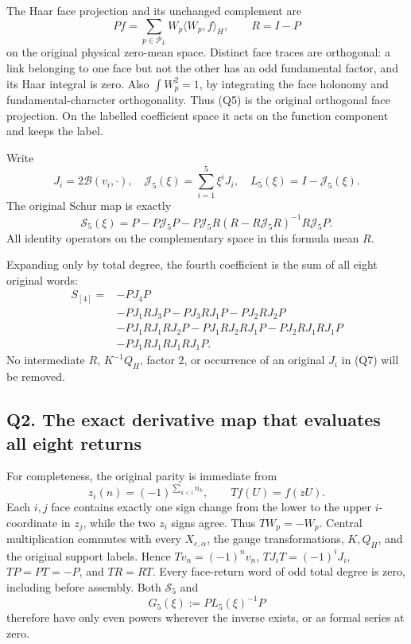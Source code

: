 \documentclass[11pt]{article}
\begin{document}
The Haar face projection and its unchanged complement are
\[
 Pf=\sum_{p\in\mathcal P_L}W_p\langle W_p,f\rangle_H,\qquad R=I-P
 \tag{Q5}
\]
on the original physical zero-mean space. Distinct face traces are orthogonal: a link belonging to one face but not the other has an odd fundamental factor, and its Haar integral is zero. Also \(\int W_p^2=1\), by integrating the face holonomy and fundamental-character orthogonality. Thus (Q5) is the original orthogonal face projection. On the labelled coefficient space it acts on the function component and keeps the label.

Write
\[
 J_i=2\mathcal B(v_i,\cdot),\quad
 \mathcal J_5(\xi)=\sum_{i=1}^5\xi^iJ_i,\quad
 L_5(\xi)=I-\mathcal J_5(\xi).
\]
The original Schur map is exactly
\[
 \mathscr S_5(\xi)
 =P-P\mathcal J_5P
 -P\mathcal J_5R(R-R\mathcal J_5R)^{-1}R\mathcal J_5P .
 \tag{Q6}
\]
All identity operators on the complementary space in this formula mean \(R\).

Expanding only by total degree, the fourth coefficient is the sum of all eight original words:
\[
 \begin{aligned}
 S_{[4]}={}&-PJ_4P\\
 &-PJ_1RJ_3P-PJ_3RJ_1P-PJ_2RJ_2P\\
 &-PJ_1RJ_1RJ_2P-PJ_1RJ_2RJ_1P-PJ_2RJ_1RJ_1P\\
 &-PJ_1RJ_1RJ_1RJ_1P.
 \end{aligned}\tag{Q7}
\]
No intermediate \(R\), \(K^{-1}Q_H\), factor 2, or occurrence of an original \(J_i\) in (Q7) will be removed.

\subsection*{Q2. The exact derivative map that evaluates all eight returns}

For completeness, the original parity is immediate from
\[
 z_i(n)=(-1)^{\sum_{k<i}n_k},\qquad Tf(U)=f(zU).
\]
Each \(i,j\) face contains exactly one sign change from the lower to the upper \(i\)-coordinate in \(z_j\), while the two \(z_i\) signs agree. Thus \(TW_p=-W_p\). Central multiplication commutes with every \(X_{e,\alpha}\), the gauge transformations, \(K,Q_H\), and the original support labels. Hence \(Tv_n=(-1)^nv_n\), \(TJ_iT=(-1)^iJ_i\), \(TP=PT=-P\), and \(TR=RT\). Every face-return word of odd total degree is zero, including before assembly. Both \(\mathscr S_5\) and
\[
 G_5(\xi):=PL_5(\xi)^{-1}P
 \tag{Q8}
\]
therefore have only even powers wherever the inverse exists, or as formal series at zero.
\end{document}

